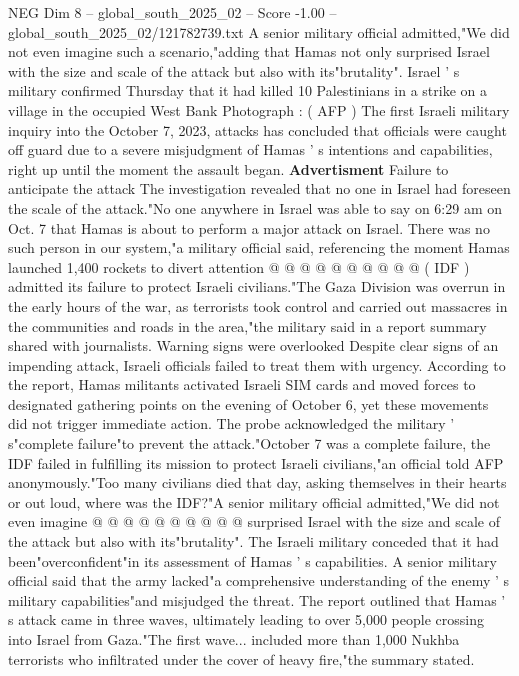 \begin{textsample}{NEG Dim 8 – global\_south\_2025\_02 – Score -1.00 – global\_south\_2025\_02/121782739.txt}  \label{ex:f8_neg_062}
A senior military official admitted,"We did not even imagine such a scenario,"adding that Hamas not only surprised Israel with the size and scale of the attack but also with its"brutality".
Israel ' s military confirmed Thursday that it had killed 10 Palestinians in a strike on a village in the occupied West Bank Photograph : ( AFP ) The first Israeli military inquiry into the October 7, 2023, attacks has concluded that officials were caught off guard due to a severe misjudgment of Hamas ' s intentions and capabilities, right up until the moment the assault began. \textbf{Advertisment} Failure to anticipate the attack The investigation revealed that no one in Israel had foreseen the scale of the attack."No one anywhere in Israel was able to say on 6:29 am on Oct. 7 that Hamas is about to perform a major attack on Israel.
There was no such person in our system,"a military official said, referencing the moment Hamas launched 1,400 rockets to divert attention @ @ @ @ @ @ @ @ @ @ ( IDF ) admitted its failure to protect Israeli civilians."The Gaza Division was overrun in the early hours of the war, as terrorists took control and carried out massacres in the communities and roads in the area,"the military said in a report summary shared with journalists.
Warning signs were overlooked Despite clear signs of an impending attack, Israeli officials failed to treat them with urgency.
According to the report, Hamas militants activated Israeli SIM cards and moved forces to designated gathering points on the evening of October 6, yet these movements did not trigger immediate action.
The probe acknowledged the military ' s"complete failure"to prevent the attack."October 7 was a complete failure, the IDF failed in fulfilling its mission to protect Israeli civilians,"an official told AFP anonymously."Too many civilians died that day, asking themselves in their hearts or out loud, where was the IDF?"A senior military official admitted,"We did not even imagine @ @ @ @ @ @ @ @ @ @ surprised Israel with the size and scale of the attack but also with its"brutality".
The Israeli military conceded that it had been"overconfident"in its assessment of Hamas ' s capabilities.
A senior military official said that the army lacked"a comprehensive understanding of the enemy ' s military capabilities"and misjudged the threat.
The report outlined that Hamas ' s attack came in three waves, ultimately leading to over 5,000 people crossing into Israel from Gaza."The first wave... included more than 1,000 Nukhba terrorists who infiltrated under the cover of heavy fire,"the summary stated.

\end{textsample}

